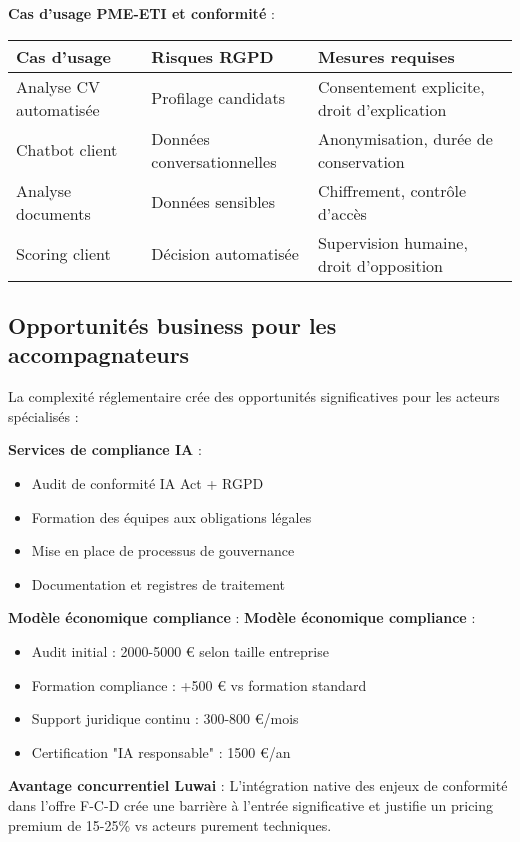 \textbf{Cas d'usage PME-ETI et conformité} :
\begin{longtable}{@{}p{4cm}p{5cm}p{5cm}@{}}
\toprule
\textbf{Cas d'usage} & \textbf{Risques RGPD} & \textbf{Mesures requises} \\
\midrule
Analyse CV automatisée & Profilage candidats & Consentement explicite, droit d'explication \\
Chatbot client & Données conversationnelles & Anonymisation, durée de conservation \\
Analyse documents & Données sensibles & Chiffrement, contrôle d'accès \\
Scoring client & Décision automatisée & Supervision humaine, droit d'opposition \\
\bottomrule
\end{longtable}

\subsection{Opportunités business pour les accompagnateurs}

La complexité réglementaire crée des opportunités significatives pour les acteurs spécialisés :

\textbf{Services de compliance IA} :
\begin{itemize}
    \item Audit de conformité IA Act + RGPD
    \item Formation des équipes aux obligations légales
    \item Mise en place de processus de gouvernance
    \item Documentation et registres de traitement
\end{itemize}

\textbf{Modèle économique compliance} :
\textbf{Modèle économique compliance} :
\begin{itemize}
    \item Audit initial : 2000-5000 € selon taille entreprise
    \item Formation compliance : +500 € vs formation standard
    \item Support juridique continu : 300-800 €/mois
    \item Certification "IA responsable" : 1500 €/an
\end{itemize}

\textbf{Avantage concurrentiel Luwai} :
L'intégration native des enjeux de conformité dans l'offre F-C-D crée une barrière à l'entrée significative et justifie un pricing premium de 15-25\% vs acteurs purement techniques.
